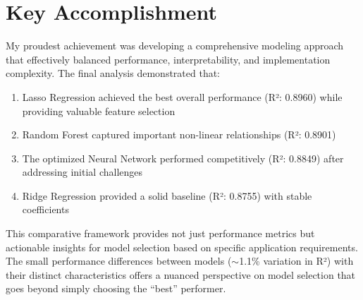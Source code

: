 \documentclass[12pt]{article}
\begin{document}
\section*{Key Accomplishment}

My proudest achievement was developing a comprehensive modeling approach that effectively balanced performance, interpretability, and implementation complexity. The final analysis demonstrated that:

\begin{enumerate}
    \item Lasso Regression achieved the best overall performance (R²: 0.8960) while providing valuable feature selection
    \item Random Forest captured important non-linear relationships (R²: 0.8901)
    \item The optimized Neural Network performed competitively (R²: 0.8849) after addressing initial challenges
    \item Ridge Regression provided a solid baseline (R²: 0.8755) with stable coefficients
\end{enumerate}

This comparative framework provides not just performance metrics but actionable insights for model selection based on specific application requirements. The small performance differences between models ($\sim$1.1\% variation in R²) with their distinct characteristics offers a nuanced perspective on model selection that goes beyond simply choosing the ``best'' performer.
\end{document}
